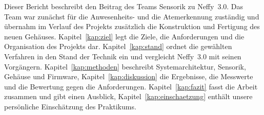 Dieser Bericht beschreibt den Beitrag des Teams Sensorik zu Neffy~3.0. Das Team war zunächst
für die Anwesenheits- und die Atemerkennung zuständig und übernahm im Verlauf des Projekts
zusätzlich die Konstruktion und Fertigung des neuen Gehäuses. Kapitel~\ref{kap:ziel} legt die
Ziele, die Anforderungen und die Organisation des Projekts dar. Kapitel~\ref{kap:stand}
ordnet die gewählten Verfahren in den Stand der Technik ein und vergleicht Neffy~3.0 mit
seinen Vorgängern. Kapitel~\ref{kap:methoden} beschreibt Systemarchitektur, Sensorik,
Gehäuse und Firmware, Kapitel~\ref{kap:diskussion} die Ergebnisse, die Messwerte und die
Bewertung gegen die Anforderungen. Kapitel~\ref{kap:fazit} fasst die Arbeit zusammen und
gibt einen Ausblick, Kapitel~\ref{kap:einschaetzung} enthält unsere persönliche Einschätzung
des Praktikums.
